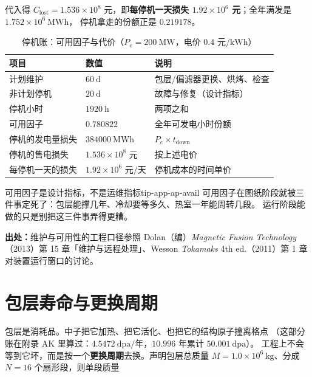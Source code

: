 代入得 $C_{\text{lost}} = 1.536\times10^{8}$ 元，即\textbf{每停机一天损失
$1.92\times10^{6}$ 元}；全年满发是 $1.752\times10^{6}\ \mathrm{MWh}$，
停机拿走的份额正是 $0.219178$。

\begin{table}[htbp]
\centering
\small
\caption{停机账：可用因子与代价（$P_e = 200\ \mathrm{MW}$，电价 $0.4$ 元$/\mathrm{kWh}$）}
\label{tab:app-ap-avail}
\setlength{\tabcolsep}{4pt}
\begin{tabular}{p{5.6cm}p{4.4cm}p{5.6cm}}
\toprule
项目 & 数值 & 说明 \\
\midrule
计划维护 & $60\ \mathrm{d}$ & 包层/偏滤器更换、烘烤、检查 \\
非计划停机 & $20\ \mathrm{d}$ & 故障与修复（设计指标） \\
停机小时 & $1920\ \mathrm{h}$ & 两项之和 \\
可用因子 & $0.780822$ & 全年可发电小时份额 \\
停机的发电量损失 & $384000\ \mathrm{MWh}$ & $P_e \times t_{\text{down}}$ \\
停机的售电损失 & $1.536\times10^{8}$ 元 & 按上述电价 \\
每停机一天的损失 & $1.92\times10^{6}$ 元$/$天 & 停机成本的时间单价 \\
\bottomrule
\end{tabular}
\end{table}

\begin{tip}{可用因子是设计指标，不是运维指标}{tip-app-ap-avail}
可用因子在图纸阶段就被三件事定死了：包层能撑几年、冷却要等多久、热室一年能周转几段。
运行阶段能做的只是别把这三件事弄得更糟。
\end{tip}

{\footnotesize
\textbf{出处：}维护与可用性的工程口径参照 Dolan（编）\textit{Magnetic Fusion Technology}
（2013）第 15 章「维护与远程处理」、Wesson \textit{Tokamaks} 4th ed.（2011）第 1 章
对装置运行窗口的讨论。
}

\section{包层寿命与更换周期}
\label{sec:app-ap-blanket}

包层是消耗品。中子把它加热、把它活化、也把它的结构原子撞离格点
（这部分账在附录 AK 里算过：$4.5472\ \mathrm{dpa}/$年，$10.996$ 年累计 $50.001\ \mathrm{dpa}$）。
工程上不会等到它坏，而是按一个\textbf{更换周期}去换。声明包层总质量
$M = 1.0\times10^{6}\ \mathrm{kg}$、分成 $N = 16$ 个扇形段，则单段质量

